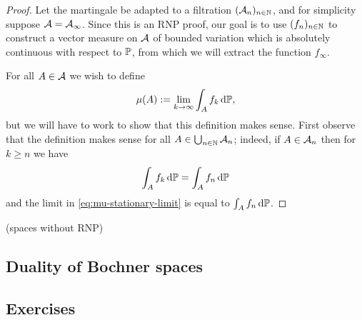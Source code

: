 \begin{proof}
  Let the martingale be adapted to a filtration $(\mc{A}_n)_{n \in \N}$, and for simplicity suppose $\mc{A} = \mc{A}_\infty$.
  Since this is an RNP proof, our goal is to use $(f_n)_{n \in \N}$ to construct a vector measure on $\mc{A}$ of bounded variation which is absolutely continuous with respect to $\P$, from which we will extract the function $f_\infty$.

  For all $A \in \mc{A}$ we wish to define
  \begin{equation}\label{eq:mu-stationary-limit}
    \mu(A) := \lim_{k \to \infty} \int_A f_k \, \dd\P,
  \end{equation}
  but we will have to work to show that this definition makes sense.
  First observe that the definition makes sense for all $A \in \bigcup_{n \in \N} \mc{A}_{n}$; indeed, if $A \in \mc{A}_{n}$ then for $k \geq n$ we have
  \begin{equation*}
    \int_A f_k \, \dd\P = \int_A f_n \, \dd \P
  \end{equation*}
  and the limit in \eqref{eq:mu-stationary-limit} is equal to $\int_A f_n \, \dd\P$.
\end{proof}

\begin{cor}
  (spaces without RNP)
\end{cor}

\subsection{Duality of Bochner spaces}

\subsection*{Exercises}


